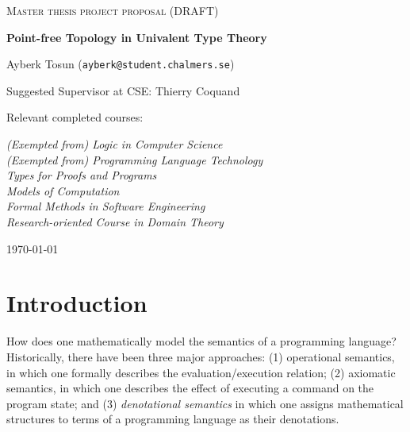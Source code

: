 \documentclass{article}
\begin{document}
\begin{titlepage}

\centering
  
{\scshape\LARGE Master thesis project proposal (DRAFT)\\}
  
\vspace{0.5cm}
  
{\huge\bfseries Point-free Topology in Univalent Type Theory\\}
  
\vspace{2cm}
  
{\Large Ayberk Tosun (\texttt{ayberk@student.chalmers.se})\\}
  
\vspace{1.0cm}
  
{\large Suggested Supervisor at CSE: Thierry Coquand\\}
  
\vspace{1.5cm}
  
{\large Relevant completed courses:\par}
  
{\itshape (Exempted from) Logic in Computer Science\\}
{\itshape (Exempted from) Programming Language Technology\\}
{\itshape Types for Proofs and Programs\\}
{\itshape Models of Computation\\}
{\itshape Formal Methods in Software Engineering\\}
{\itshape Research-oriented Course in Domain Theory\\}
  
\vfill

\vfill
  
{\large \today\\} 

\end{titlepage}
\section{Introduction}

How does one mathematically model the semantics of a programming language? Historically,
there have been three major approaches: (1) operational semantics, in which one formally
describes the evaluation/execution relation; (2) axiomatic semantics, in which one
describes the effect of executing a command on the program state; and (3)
\emph{denotational semantics} in which one assigns mathematical structures to terms of a
programming language as their denotations.
\end{document}
